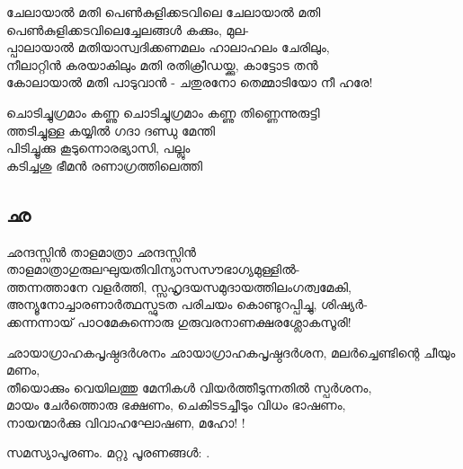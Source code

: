 \begin{enumerate}

\begin{slokam}{\VSv}{\VKG}{ചേലായാൽ മതി പെൺകുളിക്കടവിലെ}
ചേലായാൽ മതി പെൺകുളിക്കടവിലെച്ചേലങ്ങള്‍ കക്കും, മുല-\\
പ്പാലായാൽ മതിയാസ്വദിക്കണമലം ഹാലാഹലം ചേരിലും,\\
നീലാറ്റിൻ കരയാകിലും മതി രതിക്രീഡയ്ക്കു, കാട്ടോട തൻ\\
കോലായാൽ മതി പാടുവാൻ - ചതുരനോ തെമ്മാടിയോ നീ ഹരേ!
\end{slokam}


\begin{slokam}{\VBh}{\PKV}{ചൊടിച്ചുഗ്രമാം കണ്ണു}
ചൊടിച്ചുഗ്രമാം കണ്ണു തിണ്ണെന്നുരുട്ടി\\
ത്തടിച്ചുള്ള കയ്യിൽ ഗദാ ദണ്ഡു മേന്തി\\
പിടിച്ചൂക്കു കൂടുന്നൊരഭ്യാസി, പല്ലും\\
കടിച്ചശു ഭീമൻ രണാഗ്രത്തിലെത്തി
\end{slokam}



\end{enumerate}


\subsection{ഛ}
\begin{enumerate}

\begin{slokam}{\VSr}{\VKG}{ഛന്ദസ്സിൻ താളമാത്രാ}
ഛന്ദസ്സിൻ താളമാത്രാഗുരുലഘുയതിവിന്യാസസൗഭാഗ്യമുള്ളിൽ-\\
ത്തന്നത്താനേ വളർത്തി, സ്സഹൃദയസമുദായത്തിലംഗത്വമേകി,\\
അന്യൂനോച്ചാരണാർത്ഥസ്ഫുടത പരിചയം കൊണ്ടുറപ്പിച്ചു, ശിഷ്യർ-\\
ക്കന്നന്നായ്‌ പാഠമേകുന്നൊരു ഗുരുവരനാണക്ഷരശ്ലോകസൂരി!
\end{slokam}



\begin{slokam}{\VSv}{\UN}{ഛായാഗ്രാഹകപൃഷ്ഠദർശനം} 
ഛായാഗ്രാഹകപൃഷ്ഠദർശന, മലർച്ചെണ്ടിന്റെ ചീയും മണം,\\
തീയൊക്കും വെയിലത്തു മേനികള്‍ വിയർത്തീടുന്നതിൽ  സ്പർശനം,\\
മായം ചേർത്തൊരു ഭക്ഷണം, ചെകിടടച്ചീടും വിധം ഭാഷണം,\\
നായന്മാർക്കു വിവാഹഘോഷണ, മഹോ! !
\end{slokam}



സമസ്യാപൂരണം. മറ്റു പൂരണങ്ങൾ: .



\end{enumerate}

